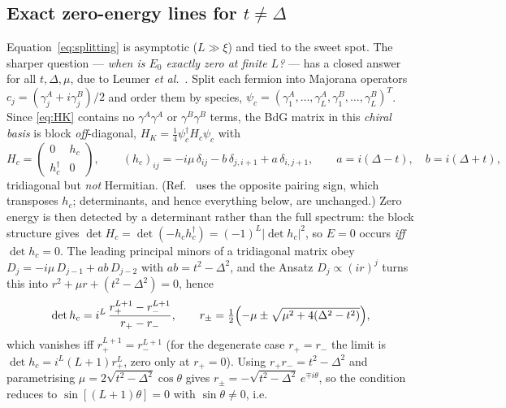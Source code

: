 \subsection{Exact zero-energy lines for \texorpdfstring{$t \neq \Delta$}{t != Delta}}
\label{sec:majoranalines}
Equation~\eqref{eq:splitting} is asymptotic ($L \gg \xi$) and tied to the
sweet spot. The sharper question --- \emph{when is $E_0$ exactly zero at
finite $L$?} --- has a closed answer for all $t,\Delta,\mu$, due to Leumer
\emph{et al.}~\cite{leumer2020,leumer2021thesis}. Split each fermion into
Majorana operators $c_j = (\gamma_j^A + i\gamma_j^B)/2$ and order them by
species, $\psi_c = (\gamma_1^A,\dots,\gamma_L^A,\gamma_1^B,\dots,\gamma_L^B)^T$.
Since \eqref{eq:HK} contains no $\gamma^A\gamma^A$ or $\gamma^B\gamma^B$
terms, the BdG matrix in this \emph{chiral basis} is block \emph{off}-diagonal,
$H_K = \tfrac14 \psi_c^\dagger H_c \psi_c$ with
\begin{equation}
  H_c = \begin{pmatrix} 0 & h_c \\ h_c^\dagger & 0 \end{pmatrix}, \qquad
  (h_c)_{ij} = -i\mu\,\delta_{ij} - b\,\delta_{j,i+1} + a\,\delta_{i,j+1},
  \qquad a = i(\Delta - t), \quad b = i(\Delta + t),
  \label{eq:chiral}
\end{equation}
tridiagonal but \emph{not} Hermitian. (Ref.~\cite{leumer2021thesis} uses the
opposite pairing sign, which transposes $h_c$; determinants, and hence
everything below, are unchanged.) Zero energy is then detected by a
determinant rather than the full spectrum: the block structure gives
$\det H_c = \det(-h_c h_c^\dagger) = (-1)^L |\det h_c|^2$, so $E = 0$ occurs
\emph{iff} $\det h_c = 0$. The leading principal minors of a tridiagonal
matrix obey $D_j = -i\mu\,D_{j-1} + ab\,D_{j-2}$ with $ab = t^2 - \Delta^2$,
and the Ansatz $D_j \propto (ir)^j$ turns this into
$r^2 + \mu r + (t^2-\Delta^2) = 0$, hence
\begin{equation}
  \det h_c = i^L\,\frac{r_+^{L+1} - r_-^{L+1}}{r_+ - r_-},
  \qquad
  r_\pm = \tfrac12\Bigl(-\mu \pm \sqrt{\mu^2 + 4(\Delta^2 - t^2)}\Bigr),
  \label{eq:deth}
\end{equation}
which vanishes iff $r_+^{L+1} = r_-^{L+1}$ (for the degenerate case
$r_+ = r_-$ the limit is $\det h_c = i^L (L+1) r_+^L$, zero only at
$r_+ = 0$). Using
$r_+ r_- = t^2-\Delta^2$ and parametrising
$\mu = 2\sqrt{t^2-\Delta^2}\cos\theta$ gives
$r_\pm = -\sqrt{t^2-\Delta^2}\,e^{\mp i\theta}$, so the condition reduces to
$\sin[(L+1)\theta] = 0$ with $\sin\theta \neq 0$, i.e.\
